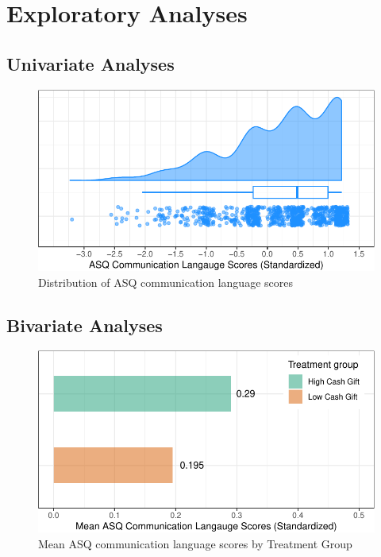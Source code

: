 \documentclass[sn-basic,pdflatex]{sn-jnl}
\begin{document}
\section{Exploratory Analyses}\label{exploratory-analyses}

\subsection{Univariate Analyses}\label{univariate-analyses}

\begin{figure}[H]

{\centering \includegraphics{HWC_progress-report-4_files/figure-latex/fig_rain_ASQ-1} 

}

\caption{Distribution of ASQ communication language scores}\label{fig:fig_rain_ASQ}
\end{figure}

\subsection{Bivariate Analyses}\label{bivariate-analyses}

\begin{figure}[H]

{\centering \includegraphics{HWC_progress-report-4_files/figure-latex/fig_bar_treat_ASQ-1} 

}

\caption{Mean ASQ communication language scores by Treatment Group}\label{fig:fig_bar_treat_ASQ}
\end{figure}
\end{document}
